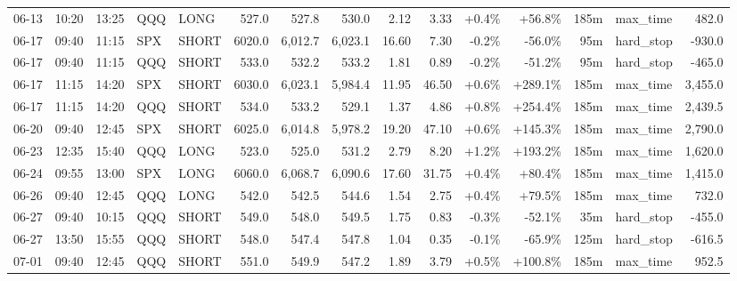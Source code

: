 \documentclass[11pt,a4paper,twoside]{article}
\begin{document}
\begin{landscape}
\begin{center}
\begin{longtable}{>{\color{txtmain}}l l l l l r r r r r r r r >{\color{txtmain}}l r}
06-13 & 10:20 & 13:25 & QQQ & LONG & 527.0 & 527.8 & 530.0 & 2.12 & 3.33 & \textcolor{wingreen}{+0.4\%} & \textcolor{wingreen}{+56.8\%} & 185m & max\_time & \textcolor{wingreen}{482.0} \\
06-17 & 09:40 & 11:15 & SPX & SHORT & 6020.0 & 6,012.7 & 6,023.1 & 16.60 & 7.30 & \textcolor{lossred}{-0.2\%} & \textcolor{lossred}{-56.0\%} & 95m & hard\_stop & \textcolor{lossred}{-930.0} \\
06-17 & 09:40 & 11:15 & QQQ & SHORT & 533.0 & 532.2 & 533.2 & 1.81 & 0.89 & \textcolor{lossred}{-0.2\%} & \textcolor{lossred}{-51.2\%} & 95m & hard\_stop & \textcolor{lossred}{-465.0} \\
06-17 & 11:15 & 14:20 & SPX & SHORT & 6030.0 & 6,023.1 & 5,984.4 & 11.95 & 46.50 & \textcolor{wingreen}{+0.6\%} & \textcolor{wingreen}{+289.1\%} & 185m & max\_time & \textcolor{wingreen}{3,455.0} \\
06-17 & 11:15 & 14:20 & QQQ & SHORT & 534.0 & 533.2 & 529.1 & 1.37 & 4.86 & \textcolor{wingreen}{+0.8\%} & \textcolor{wingreen}{+254.4\%} & 185m & max\_time & \textcolor{wingreen}{2,439.5} \\
06-20 & 09:40 & 12:45 & SPX & SHORT & 6025.0 & 6,014.8 & 5,978.2 & 19.20 & 47.10 & \textcolor{wingreen}{+0.6\%} & \textcolor{wingreen}{+145.3\%} & 185m & max\_time & \textcolor{wingreen}{2,790.0} \\
06-23 & 12:35 & 15:40 & QQQ & LONG & 523.0 & 525.0 & 531.2 & 2.79 & 8.20 & \textcolor{wingreen}{+1.2\%} & \textcolor{wingreen}{+193.2\%} & 185m & max\_time & \textcolor{wingreen}{1,620.0} \\
06-24 & 09:55 & 13:00 & SPX & LONG & 6060.0 & 6,068.7 & 6,090.6 & 17.60 & 31.75 & \textcolor{wingreen}{+0.4\%} & \textcolor{wingreen}{+80.4\%} & 185m & max\_time & \textcolor{wingreen}{1,415.0} \\
06-26 & 09:40 & 12:45 & QQQ & LONG & 542.0 & 542.5 & 544.6 & 1.54 & 2.75 & \textcolor{wingreen}{+0.4\%} & \textcolor{wingreen}{+79.5\%} & 185m & max\_time & \textcolor{wingreen}{732.0} \\
06-27 & 09:40 & 10:15 & QQQ & SHORT & 549.0 & 548.0 & 549.5 & 1.75 & 0.83 & \textcolor{lossred}{-0.3\%} & \textcolor{lossred}{-52.1\%} & 35m & hard\_stop & \textcolor{lossred}{-455.0} \\
06-27 & 13:50 & 15:55 & QQQ & SHORT & 548.0 & 547.4 & 547.8 & 1.04 & 0.35 & \textcolor{lossred}{-0.1\%} & \textcolor{lossred}{-65.9\%} & 125m & hard\_stop & \textcolor{lossred}{-616.5} \\
07-01 & 09:40 & 12:45 & QQQ & SHORT & 551.0 & 549.9 & 547.2 & 1.89 & 3.79 & \textcolor{wingreen}{+0.5\%} & \textcolor{wingreen}{+100.8\%} & 185m & max\_time & \textcolor{wingreen}{952.5} \\

\end{longtable}
\end{center}
\end{landscape}
\end{document}

